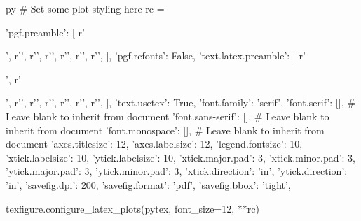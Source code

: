 \begin{pythontexcustomcode}{py}
# Set some plot styling here
rc = {
	'pgf.preamble': [
		r'\usepackage{siunitx}',
		r'\DeclareSIUnit[number-unit-product={}]',
		r'\DeclareSIUnit[number-unit-product={}]',
		r'\DeclareSIUnit[number-unit-product={}]',
		r'\DeclareSIUnit[number-unit-product={}]',
		r'\DeclareSIUnit[number-unit-product={}]',
		r'\DeclareSIUnit[number-unit-product={}]',
	],
	'pgf.rcfonts': False,
	'text.latex.preamble': [
		r'\usepackage{mathpazo}',
		r'\usepackage{siunitx}',
		r'\DeclareSIUnit[number-unit-product={}]',
		r'\DeclareSIUnit[number-unit-product={}]',
		r'\DeclareSIUnit[number-unit-product={}]',
		r'\DeclareSIUnit[number-unit-product={}]',
		r'\DeclareSIUnit[number-unit-product={}]',
		r'\DeclareSIUnit[number-unit-product={}]',
	],
	'text.usetex': True,
	'font.family': 'serif',
	'font.serif': [], # Leave blank to inherit from document
	'font.sans-serif': [], # Leave blank to inherit from document
	'font.monospace': [], # Leave blank to inherit from document
	'axes.titlesize': 12,
	'axes.labelsize': 12,
	'legend.fontsize': 10,
	'xtick.labelsize': 10,
	'ytick.labelsize': 10,
	'xtick.major.pad': 3,
	'xtick.minor.pad': 3,
	'ytick.major.pad': 3,
	'ytick.minor.pad': 3,
	'xtick.direction': 'in',
	'ytick.direction': 'in',
	'savefig.dpi': 200,
	'savefig.format': 'pdf',
	'savefig.bbox': 'tight',
}
texfigure.configure_latex_plots(pytex, font_size=12, **rc)

\end{pythontexcustomcode}

